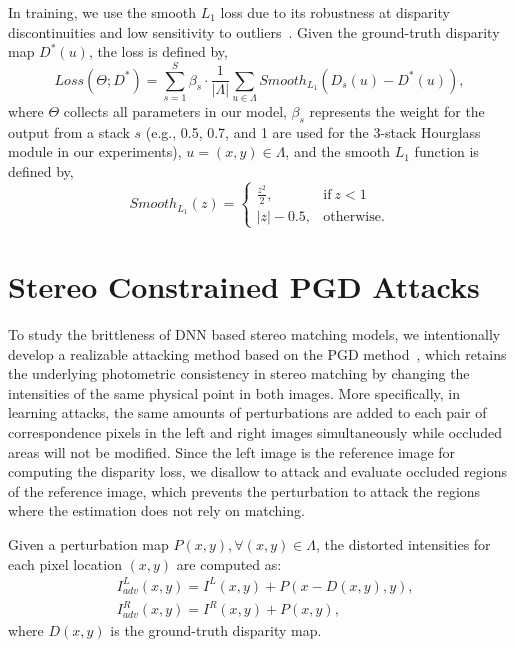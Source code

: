 \documentclass[10pt,twocolumn,letterpaper]{article}
\begin{document}
In training, we use the smooth $L_1$ loss due to its robustness at disparity discontinuities and low sensitivity to outliers~\cite{chang2018pyramid,GANet}. Given the ground-truth disparity map $D^*(u)$, the loss is defined by, 
\begin{equation}
    Loss(\Theta; D^*) = \sum_{s=1}^S \beta_s \cdot \frac{1}{|\Lambda|} \sum_{u\in \Lambda} Smooth_{L_1}(D_s(u)-D^*(u)),
\end{equation}
where $\Theta$ collects all parameters in our model, $\beta_s$ represents the weight for the output from a stack $s$ (e.g., 0.5, 0.7, and 1 are used for the 3-stack Hourglass module in our experiments), $u=(x,y)\in \Lambda$, and the smooth $L_1$ function is defined by,
\begin{equation}
Smooth_{L_1}(z)=
\begin{cases}
\frac{z^2}{2}, & \text{if}\ z<1 \\
|z|-0.5, & \text{otherwise.}
\end{cases}
\end{equation}

\section{Stereo Constrained PGD Attacks} \label{sec:attacks}
To study the brittleness of DNN based stereo matching models, we intentionally develop a realizable attacking method based on the PGD method~\cite{PGD}, which retains the underlying photometric consistency in stereo matching by changing the intensities of the same physical point in both images. More specifically, in learning attacks, the same amounts of perturbations are added to each pair of correspondence pixels in the left and right images simultaneously while occluded areas will not be modified. Since the left image is the reference image for computing the disparity loss, we disallow to attack and evaluate occluded regions of the reference image, which prevents the perturbation to attack the regions where the estimation does not rely on matching.

Given a perturbation map $P(x,y), \forall (x,y)\in \Lambda$, the distorted intensities for each pixel location $(x,y)$ are computed as:
\begin{equation}
    \begin{split} 
    &I_{adv}^L(x,y) = I^L(x,y) + P(x-D(x,y),y), \\
    &I_{adv}^R(x,y) = I^R(x,y) + P(x,y), \label{eq:attack}
    \end{split}
\end{equation}
where $D(x,y)$ is the ground-truth disparity map. 
\end{document}
